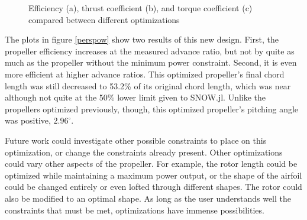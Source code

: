 \documentclass[journal ]{new-aiaa}
\begin{document}
\begin{figure}[H]
\centering

	\hspace{1em}
	\caption{Efficiency (a), thrust coefficient (b), and torque coefficient (c) compared between different optimizations}
	\captionsetup{aboveskip=0pt,font=it}
	\label{perspow}
\end{figure}

The plots in figure \eqref{perspow} show two results of this new design. First, the propeller efficiency increases at the measured advance ratio, but not by quite as much as the propeller without the minimum power constraint. Second, it is even more efficient at higher advance ratios. This optimized propeller's final chord length was still decreased to 53.2\% of its original chord length, which was near although not quite at the 50\% lower limit given to SNOW.jl. Unlike the propellers optimized previously, though, this optimized propeller's pitching angle was positive, $2.96^{\circ}$.

Future work could investigate other possible constraints to place on this optimization, or change the constraints already present. Other optimizations could vary other aspects of the propeller. For example, the rotor length could be optimized while maintaining a maximum power output, or the shape of the airfoil could be changed entirely or even lofted through different shapes. The rotor could also be modified to an optimal shape. As long as the user understands well the constraints that must be met, optimizations have immense possibilities.
\end{document}
